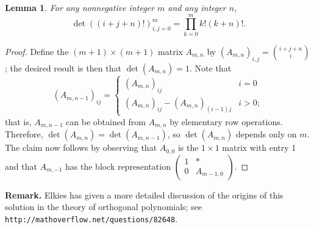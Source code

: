 \documentclass[amssymb,twocolumn,pra,10pt,aps]{revtex4-1}
\newtheorem{lemma}{Lemma}
\begin{document}
\begin{itemize}
\begin{lemma}
For any nonnegative integer $m$ and any integer $n$,
\[
\det((i+j+n)!)_{i,j=0}^m = \prod_{k=0}^m k! (k+n)!.
\]
\end{lemma}
\begin{proof}
Define the $(m+1) \times (m+1)$ matrix $A_{m,n}$ by $(A_{m,n})_{i,j} = \binom{i+j+n}{i}$;
the desired result is then that $\det(A_{m,n}) = 1$. Note that
\[
(A_{m,n-1})_{ij} = \begin{cases}
(A_{m,n})_{ij} & i=0 \\
(A_{m,n})_{ij} - (A_{m,n})_{(i-1)j} & i > 0;
\end{cases}
\]
that is, $A_{m,n-1}$ can be obtained from $A_{m,n}$ by elementary row operations.
Therefore, $\det(A_{m,n}) = \det(A_{m,n-1})$, so $\det(A_{m,n})$ depends only on $m$.
The claim now follows by observing that $A_{0,0}$ is the $1 \times 1$ matrix with entry 1
and that $A_{m,-1}$ has the block representation $\begin{pmatrix} 1 & * \\ 0 & A_{m-1,0} \end{pmatrix}$.
\end{proof}

\noindent
\textbf{Remark.}
Elkies has given a more detailed discussion of the origins of this solution in the theory of orthogonal
polynomials; see \texttt{http://mathoverflow.net/questions/82648}.


\end{itemize}
\end{document}
